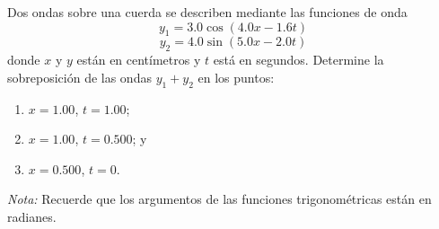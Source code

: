 \item Dos ondas sobre una cuerda se describen mediante las funciones de onda
$$ y_1 = 3.0 \cos (4.0x - 1.6t) $$
$$ y_2 = 4.0 \sin (5.0x - 2.0t) $$
donde $x$ y $y$ están en centímetros y $t$ está en segundos. Determine la sobreposición de las ondas $y_1 + y_2$ en los puntos:
\begin{enumerate}
    \item $x = 1.00$, $t = 1.00$;
    \item $x = 1.00$, $t = 0.500$; y
    \item $x = 0.500$, $t = 0$.
\end{enumerate}
\textit{Nota:} Recuerde que los argumentos de las funciones trigonométricas están en radianes.